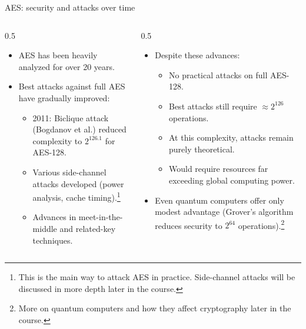 \documentclass[aspectratio=169, lualatex, handout]{beamer}
\begin{document}
\begin{frame}{AES: security and attacks over time}
 \begin{columns}[c]
  \begin{column}{0.5\textwidth}
   \begin{itemize}[<+->]
    \item AES has been heavily analyzed for over 20 years.
    \item Best attacks against full AES have gradually improved:
          \begin{itemize}[<+->]
           \item 2011: Biclique attack (Bogdanov et al.) reduced complexity to $2^{126.1}$ for AES-128.
           \item Various side-channel attacks developed (power analysis, cache timing).\footnote{This is the main way to attack AES in practice. Side-channel attacks will be discussed in more depth later in the course.}
           \item Advances in meet-in-the-middle and related-key techniques.
          \end{itemize}
   \end{itemize}
  \end{column}
  \begin{column}{0.5\textwidth}
   \begin{itemize}[<+->]
    \item Despite these advances:
          \begin{itemize}[<+->]
           \item No practical attacks on full AES-128.
           \item Best attacks still require $\approx 2^{126}$ operations.
           \item At this complexity, attacks remain purely theoretical.
           \item Would require resources far exceeding global computing power.
          \end{itemize}
    \item Even quantum computers offer only modest advantage (Grover's algorithm reduces security to $2^{64}$ operations).\footnote{More on quantum computers and how they affect cryptography later in the course.}
   \end{itemize}
  \end{column}
 \end{columns}
\end{frame}

\begin{frame}[plain]
	\titlepage
\end{frame}
\end{document}

